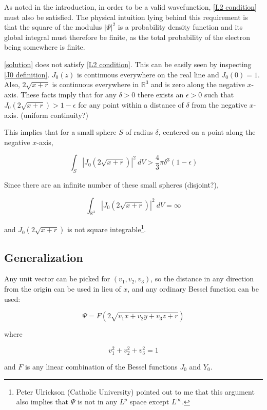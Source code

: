 \documentclass{article}
\begin{document}
As noted in the introduction, in order to be a valid wavefunction, \eqref{L2 condition} must also be satisfied.
The physical intuition lying behind this requirement is that the square of the modulus $|\Psi|^2$ is a probability
density function and its global integral must therefore be finite, as the total probability of the electron
being somewhere is finite.

\eqref{solution} does not satisfy \eqref{L2 condition}.  This can be easily seen by inspecting \eqref{J0 definition}.
$J_0(z)$ is continuous everywhere on the real line and $J_0(0)=1$.  Also, $2\sqrt{x+r}$ is continuous
everywhere in $\mathbb{R}^3$ and is zero along the negative $x$-axis.  These facts imply that for any
$\delta>0$ there exists an $\epsilon>0$ such that $J_0(2\sqrt{x+r}) > 1-\epsilon$ for any point within
a distance of $\delta$ from the negative $x$-axis. (uniform continuity?)

This implies that for a small sphere $S$ of radius $\delta$, centered on a point along the negative $x$-axis,

\[ \int_S \left|J_0(2\sqrt{x+r})\right|^2\  dV > \frac{4}{3}\pi\delta^3(1-\epsilon) \]

Since there are an infinite number of these small spheres (disjoint?),

\[ \int_{\mathbb{R}^3} \left|J_0(2\sqrt{x+r})\right|^2\ dV  = \infty \]

and $J_0(2\sqrt{x+r})$ is not square integrable\footnote{Peter Ulrickson (Catholic University) pointed out
to me that this argument also implies that $\Psi$ is not in any $L^p$ space except $L^\infty$.}.

\subsection*{Generalization}
\parskip 12pt

Any unit vector can be picked for $(v_1, v_2, v_3)$,
so the distance in any direction from the origin can be used in lieu of $x$,
and any ordinary Bessel function can be used:

\begin{equation}
\label{generalized solution}
\Psi = F(2\sqrt{v_1 x+ v_2 y+ v_3 z+r})
\end{equation}

where

\begin{equation*}
v_1^2+v_2^2+v_3^2=1
\end{equation*}

and $F$ is any linear combination of the Bessel functions $J_0$ and $Y_0$.
\end{document}
